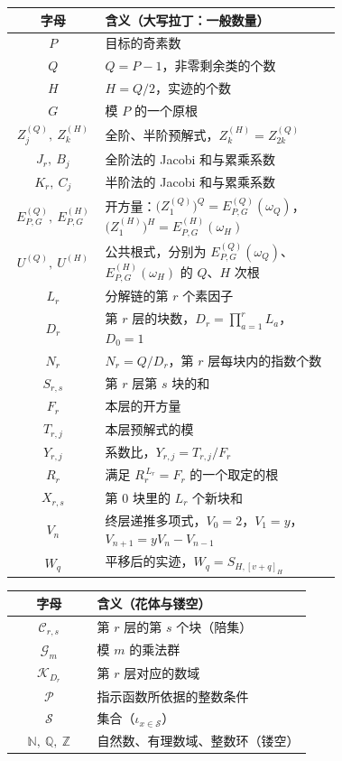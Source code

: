 \documentclass[UTF8,a4paper,11pt]{ctexart}
\newcommand{\QQ}{\mathbb Q}
\newcommand{\ZZ}{\mathbb Z}
\newcommand{\NN}{\mathbb N}
\begin{document}
\begin{center}
\begin{tabular}{c|>{\raggedright\arraybackslash}p{0.72\linewidth}}
\toprule
字母 & 含义（大写拉丁：一般数量） \\
\midrule
$P$ & 目标的奇素数 \\
$Q$ & $Q=P-1$，非零剩余类的个数 \\
$H$ & $H=Q/2$，实迹的个数 \\
$G$ & 模 $P$ 的一个原根 \\
$Z^{(Q)}_j,\ Z^{(H)}_k$ & 全阶、半阶预解式，$Z^{(H)}_k=Z^{(Q)}_{2k}$ \\
$J_r,\ B_j$ & 全阶法的 Jacobi 和与累乘系数 \\
$K_r,\ C_j$ & 半阶法的 Jacobi 和与累乘系数 \\
$E^{(Q)}_{P,G},\ E^{(H)}_{P,G}$ & 开方量：$\bigl(Z^{(Q)}_1\bigr)^Q=E^{(Q)}_{P,G}(\omega_Q)$，$\bigl(Z^{(H)}_1\bigr)^H=E^{(H)}_{P,G}(\omega_H)$ \\
$U^{(Q)},\ U^{(H)}$ & 公共根式，分别为 $E^{(Q)}_{P,G}(\omega_Q)$、$E^{(H)}_{P,G}(\omega_H)$ 的 $Q$、$H$ 次根 \\
$L_r$ & 分解链的第 $r$ 个素因子 \\
$D_r$ & 第 $r$ 层的块数，$D_r=\prod_{a=1}^{r}L_a$，$D_0=1$ \\
$N_r$ & $N_r=Q/D_r$，第 $r$ 层每块内的指数个数 \\
$S_{r,s}$ & 第 $r$ 层第 $s$ 块的和 \\
$F_r$ & 本层的开方量 \\
$T_{r,j}$ & 本层预解式的模 \\
$Y_{r,j}$ & 系数比，$Y_{r,j}=T_{r,j}/F_r$ \\
$R_r$ & 满足 $R_r^{\,L_r}=F_r$ 的一个取定的根 \\
$X_{r,s}$ & 第 $0$ 块里的 $L_r$ 个新块和 \\
$V_n$ & 终层递推多项式，$V_0=2$，$V_1=y$，$V_{n+1}=yV_n-V_{n-1}$ \\
$W_q$ & 平移后的实迹，$W_q=S_{H,[v+q]_H}$ \\
\bottomrule
\end{tabular}
\end{center}

\begin{center}
\begin{tabular}{c|>{\raggedright\arraybackslash}p{0.72\linewidth}}
\toprule
字母 & 含义（花体与镂空） \\
\midrule
$\mathscr{C}_{r,s}$ & 第 $r$ 层的第 $s$ 个块（陪集） \\
$\mathscr{G}_m$ & 模 $m$ 的乘法群 \\
$\mathscr{K}_{D_r}$ & 第 $r$ 层对应的数域 \\
$\mathscr{P}$ & 指示函数所依据的整数条件 \\
$\mathscr{S}$ & 集合（$\iota_{x\in\mathscr S}$） \\
$\NN,\ \QQ,\ \ZZ$ & 自然数、有理数域、整数环（镂空） \\
\bottomrule
\end{tabular}
\end{center}
\end{document}
